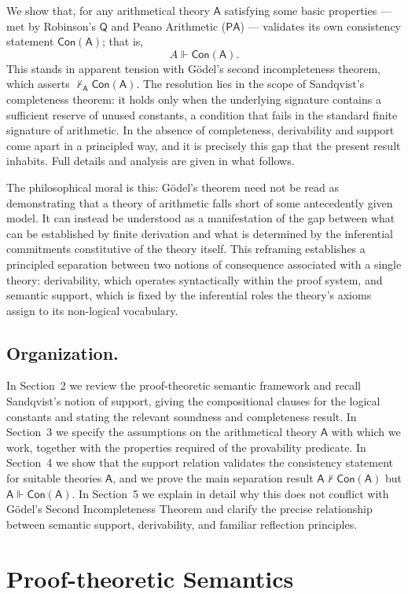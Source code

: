 \documentclass[reqno]{asl}
\newcommand{\supp}{\Vdash}
\newcommand{\pa}{\textsf{A}}
\newcommand{\Con}{\textsf{Con}}
\begin{document}
We show that, for any arithmetical theory $\pa$ satisfying some basic properties --- met by Robinson's $\mathsf{Q}$ and Peano
Arithmetic ($\mathsf{PA}$) --- validates its own consistency statement $\Con(\pa)$; that is,
\[
  A \Vdash \Con(\pa).
\]
This stands in apparent tension with G\"{o}del's second incompleteness
theorem, which asserts $\nvdash_{\pa} \Con(\pa)$. The resolution lies in the scope of Sandqvist's completeness theorem: it holds only
when the underlying signature contains a sufficient reserve of unused
constants, a condition that fails in the standard finite signature of
arithmetic. In the absence of completeness, derivability and support come
apart in a principled way, and it is precisely this gap that the present
result inhabits. Full details and analysis are given in what follows.

The philosophical moral is this: G\"{o}del's theorem need not be read as
demonstrating that a theory of arithmetic falls short of some antecedently
given model. It can instead be understood as a manifestation of the gap between what can be established by
finite derivation and what is determined by the inferential commitments
constitutive of the theory itself. This reframing establishes a principled
separation between two notions of consequence associated with a single theory:
derivability, which operates syntactically within the proof system, and
semantic support, which is fixed by the inferential roles the theory's axioms
assign to its non-logical vocabulary.

\subsection*{Organization.}
In Section~2 we review the proof-theoretic semantic framework and recall Sandqvist's notion of support, giving the compositional clauses for the logical constants and stating the relevant soundness and completeness result. In Section~3 we specify the assumptions on the arithmetical theory $\pa$ with which we work, together with the properties required of the provability predicate. In Section~4 we show that the support relation validates the consistency statement for suitable theories $\pa$, and we prove the main separation result $\pa \nvdash \Con(\pa)$ but $\pa \supp \Con(\pa)$. In Section~5 we explain in detail why this does not conflict with G\"odel's Second Incompleteness Theorem and clarify the precise relationship between semantic support, derivability, and familiar reflection principles.


\section{Proof-theoretic Semantics} \label{sec:pts}
\end{document}
